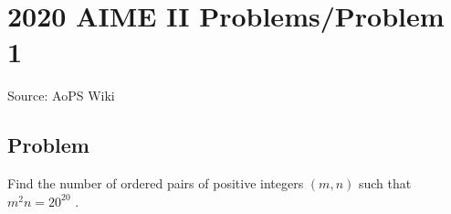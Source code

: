 \documentclass[12pt]{article}
\begin{document}
\section*{{2020 AIME II Problems/Problem 1}}
Source: AoPS Wiki

\subsection*{Problem}
Find the number of ordered pairs of positive integers $(m,n)$ such that ${m^2n = 20 ^{20}}$ .
\end{document}
